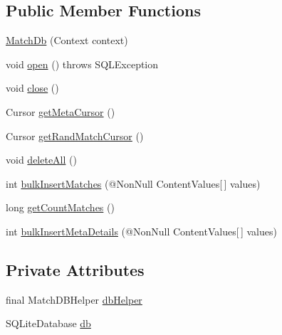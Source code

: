 \subsection*{Public Member Functions}
\begin{DoxyCompactItemize}
\item 
\hyperlink{classorg_1_1buildmlearn_1_1toolkit_1_1matchtemplate_1_1data_1_1MatchDb_a8da962dcccc5e7508a59f99af099d818}{Match\+Db} (Context context)
\item 
void \hyperlink{classorg_1_1buildmlearn_1_1toolkit_1_1matchtemplate_1_1data_1_1MatchDb_a1f3f0afd1145fcfad5b7a18dd4010436}{open} ()  throws S\+Q\+L\+Exception 
\item 
void \hyperlink{classorg_1_1buildmlearn_1_1toolkit_1_1matchtemplate_1_1data_1_1MatchDb_a009debcf6787ce1d9d2ddc133bbe1206}{close} ()
\item 
Cursor \hyperlink{classorg_1_1buildmlearn_1_1toolkit_1_1matchtemplate_1_1data_1_1MatchDb_a7f7cd9bd775127b50f046e4e934187b8}{get\+Meta\+Cursor} ()
\item 
Cursor \hyperlink{classorg_1_1buildmlearn_1_1toolkit_1_1matchtemplate_1_1data_1_1MatchDb_aa3bdb2f3715be5942019cdd1b8681fa3}{get\+Rand\+Match\+Cursor} ()
\item 
void \hyperlink{classorg_1_1buildmlearn_1_1toolkit_1_1matchtemplate_1_1data_1_1MatchDb_a72282269989e50d407091357cffbf56d}{delete\+All} ()
\item 
int \hyperlink{classorg_1_1buildmlearn_1_1toolkit_1_1matchtemplate_1_1data_1_1MatchDb_a915164eaa881a96dc9ea95522894e100}{bulk\+Insert\+Matches} (@Non\+Null Content\+Values\mbox{[}$\,$\mbox{]} values)
\item 
long \hyperlink{classorg_1_1buildmlearn_1_1toolkit_1_1matchtemplate_1_1data_1_1MatchDb_af86540cc35f17f174a1b89001600577f}{get\+Count\+Matches} ()
\item 
int \hyperlink{classorg_1_1buildmlearn_1_1toolkit_1_1matchtemplate_1_1data_1_1MatchDb_a95e9a2ac9383f00bf0572ad02716af67}{bulk\+Insert\+Meta\+Details} (@Non\+Null Content\+Values\mbox{[}$\,$\mbox{]} values)
\end{DoxyCompactItemize}
\subsection*{Private Attributes}
\begin{DoxyCompactItemize}
\item 
final Match\+D\+B\+Helper \hyperlink{classorg_1_1buildmlearn_1_1toolkit_1_1matchtemplate_1_1data_1_1MatchDb_af7159826cc3cc046e7371e971300fa2b}{db\+Helper}
\item 
S\+Q\+Lite\+Database \hyperlink{classorg_1_1buildmlearn_1_1toolkit_1_1matchtemplate_1_1data_1_1MatchDb_a165218ecad83ee3dda6bb82c993b5c84}{db}
\end{DoxyCompactItemize}


